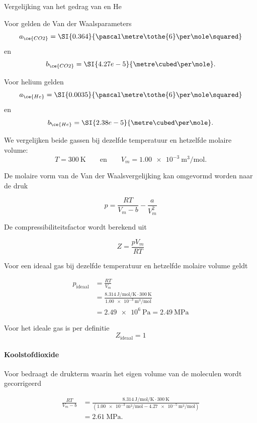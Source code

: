 \begin{voorbeeld}{Vergelijking van het gedrag van  en He}

Voor  gelden de Van der Waalsparameters
\[
a_{\ce{CO2}} = \SI{0.364}{\pascal\metre\tothe{6}\per\mole\squared}
\]
en
\[
b_{\ce{CO2}} = \SI{4.27e-5}{\metre\cubed\per\mole}.
\]

Voor helium gelden
\[
a_{\ce{He}} = \SI{0.0035}{\pascal\metre\tothe{6}\per\mole\squared}
\]
en
\[
b_{\ce{He}} = \SI{2.38e-5}{\metre\cubed\per\mole}.
\]

We vergelijken beide gassen bij dezelfde temperatuur en hetzelfde molaire volume: 
\[
T=\SI{300}{\kelvin} \qquad\text{en}\qquad V_m=\SI{1.00e-3}{\metre\cubed\per\mole}.
\]

De molaire vorm van de Van der Waalsvergelijking kan omgevormd worden naar de druk

\begin{equation*}
p = \frac{RT}{V_m-b} - \frac{a}{V_m^2}
\label{eq:vdw_numeriek_co2_he}
\end{equation*}

De compressibiliteitsfactor wordt berekend uit

\begin{equation*}
Z = \frac{pV_m}{RT}
\end{equation*}

Voor een ideaal gas bij dezelfde temperatuur en hetzelfde molaire volume geldt

\begin{align*}
p_{\mathrm{ideaal}}
&= \frac{RT}{V_m} \\
&= \frac{\SI{8.314}{\joule\per\mole\per\kelvin} \cdot \SI{300}{\kelvin}}{\SI{1.00e-3}{\metre\cubed\per\mole}} \\
&= \SI{2.49e6}{\pascal} = \SI{2.49}{\mega\pascal}
\end{align*}

Voor het ideale gas is per definitie
$$
Z_{\mathrm{ideaal}}=1
$$

\paragraph{Koolstofdioxide}

Voor  bedraagt de drukterm waarin het eigen volume van de moleculen
wordt gecorrigeerd

\begin{align*}
\frac{RT}{V_m-b}
&= \frac{\SI{8.314}{\joule\per\mole\per\kelvin} \cdot \SI{300}{\kelvin} }{ \left(\SI{1.00e-3}{\metre\cubed\per\mole} - \SI{4.27e-5}{\metre\cubed\per\mole} \right) } \\
&= \SI{2.61}{\mega\pascal}.
\end{align*}


\end{voorbeeld}
